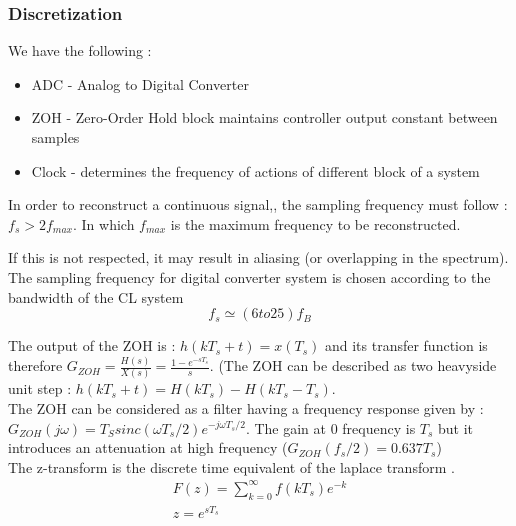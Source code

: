 \documentclass[../main.tex]{subfiles}
\begin{document}
\subsubsection{Discretization}
We have the following : \begin{itemize}
    \item ADC - Analog to Digital Converter
    \item ZOH - Zero-Order Hold block maintains controller output constant between samples
    \item Clock - determines the frequency of actions of different block of a system
\end{itemize}

\begin{theorem}
    In order to reconstruct a continuous signal,, the sampling frequency must follow : $f_s > 2f_{max}$.
    In which $f_{max}$ is the maximum frequency to be reconstructed.
\end{theorem}

If this is not respected, it may result in aliasing (or overlapping in the spectrum).\\
\warning The sampling frequency for digital converter system is chosen according to the bandwidth of the CL system \begin{equation}
    f_s \simeq (6 to 25) f_B
\end{equation}

The output of the ZOH is : $h(kT_s + t) = x(T_s)$ and its transfer function is therefore $G_{ZOH} = \frac{H(s)}{X(s)} = \frac{1-e^{-sT_s}}{s}$. (The ZOH can be described as two heavyside unit step : $h(kT_s + t) = H(kT_s) - H(kT_s - T_s)$.\\

The ZOH can be considered as a filter having a frequency response given by : $G_{ZOH}(j\omega) = T_S sinc(\omega T_s/2) e^{-j\omega T_s/2}$. The gain at 0 frequency is $T_s$ but it introduces an attenuation at high frequency ($G_{ZOH}(f_s/2) = 0.637 T_s$)\\

The z-transform is the discrete time equivalent of the laplace transform . \begin{equation}
    \begin{gathered}
        F(z) = \sum_{k=0}^\infty f(kT_s) e^{-k}\\
        z = e^{sT_s}\\
    \end{gathered}
\end{equation}
\end{document}
